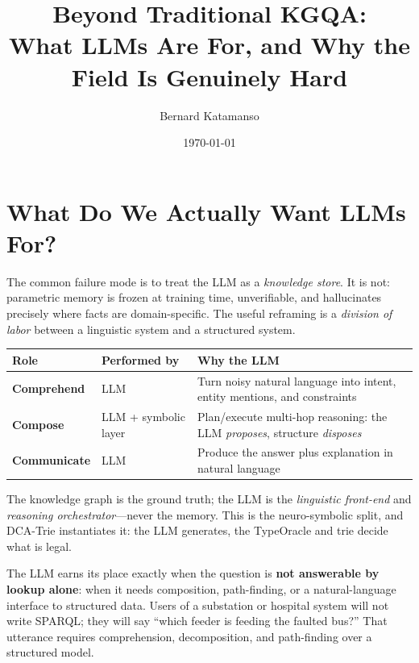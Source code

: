 \documentclass[11pt,a4paper]{article}
\title{Beyond Traditional KGQA:\\What LLMs Are For, and Why the\\
Field Is Genuinely Hard}
\author{Bernard Katamanso}
\date{\today}
\begin{document}
\maketitle

\section{What Do We Actually Want LLMs For?}

The common failure mode is to treat the LLM as a \emph{knowledge
store}.  It is not: parametric memory is frozen at training time,
unverifiable, and hallucinates precisely where facts are
domain-specific.  The useful reframing is a \emph{division of labor}
between a linguistic system and a structured system.

\begin{center}
\begin{tabular}{@{}lll@{}}
\toprule
  Role & Performed by & Why the LLM \\
\midrule
  \textbf{Comprehend} & LLM & Turn noisy natural language into intent,
    entity mentions, and constraints \\
  \textbf{Compose} & LLM + symbolic layer & Plan/execute multi-hop reasoning:
    the LLM \emph{proposes}, structure \emph{disposes} \\
  \textbf{Communicate} & LLM & Produce the answer plus explanation in
    natural language \\
\bottomrule
\end{tabular}
\end{center}

The knowledge graph is the ground truth; the LLM is the \emph{linguistic
front-end} and \emph{reasoning orchestrator}---never the memory.  This
is the neuro-symbolic split, and DCA-Trie instantiates it: the LLM
generates, the TypeOracle and trie decide what is legal.

The LLM earns its place exactly when the question is \textbf{not
answerable by lookup alone}: when it needs composition, path-finding,
or a natural-language interface to structured data.  Users of a
substation or hospital system will not write SPARQL; they will say
``which feeder is feeding the faulted bus?''  That utterance requires
comprehension, decomposition, and path-finding over a structured model.

\end{document}

